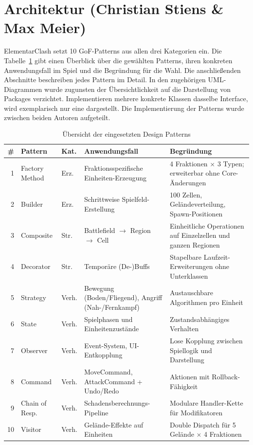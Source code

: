 \section{Architektur (Christian Stiens \& Max Meier)}
\label{chap:architektur}

ElementarClash setzt 10 GoF-Patterns aus allen drei Kategorien ein.
Die Tabelle~\ref{tab:pattern-uebersicht} gibt einen Überblick über die gewählten Patterns, ihren konkreten Anwendungsfall
im Spiel und die Begründung für die Wahl. Die anschließenden Abschnitte beschreiben jedes Pattern im Detail.
In den zugehörigen UML-Diagrammen wurde zugunsten der Übersichtlichkeit auf die Darstellung von Packages verzichtet.
Implementieren mehrere konkrete Klassen dasselbe Interface, wird exemplarisch nur eine dargestellt.
Die Implementierung der Patterns wurde zwischen beiden Autoren aufgeteilt.

\begin{table}[H]
\centering
\small
\begin{tabular}{r l l p{3.5cm} p{4.5cm}}
\toprule
\textbf{\#} & \textbf{Pattern} & \textbf{Kat.} & \textbf{Anwendungsfall} & \textbf{Begründung} \\
\midrule
1 & Factory Method & Erz. & Fraktionsspezifische Einheiten-Erzeugung & 4 Fraktionen $\times$ 3 Typen; erweiterbar ohne Core-Änderungen \\
2 & Builder & Erz. & Schrittweise Spielfeld-Erstellung & 100 Zellen, Geländeverteilung, Spawn-Positionen \\
3 & Composite & Str. & Battlefield $\to$ Region $\to$ Cell & Einheitliche Operationen auf Einzelzellen und ganzen Regionen \\
4 & Decorator & Str. & Temporäre (De-)Buffs & Stapelbare Laufzeit-Erweiterungen ohne Unterklassen \\
5 & Strategy & Verh. & Bewegung (Boden/Fliegend), Angriff (Nah-/Fernkampf) & Austauschbare Algorithmen pro Einheit \\
6 & State & Verh. & Spielphasen und Einheitenzustände & Zustandsabhängiges Verhalten \\
7 & Observer & Verh. & Event-System, UI-Entkopplung & Lose Kopplung zwischen Spiellogik und Darstellung \\
8 & Command & Verh. & MoveCommand, AttackCommand + Undo/Redo & Aktionen mit Rollback-Fähigkeit \\
9 & Chain of Resp. & Verh. & Schadensberechnungs-Pipeline & Modulare Handler-Kette für Modifikatoren \\
10 & Visitor & Verh. & Gelände-Effekte auf Einheiten & Double Dispatch für 5 Gelände $\times$ 4 Fraktionen \\
\bottomrule
\end{tabular}
\caption{Übersicht der eingesetzten Design Patterns}
\label{tab:pattern-uebersicht}
\end{table}

